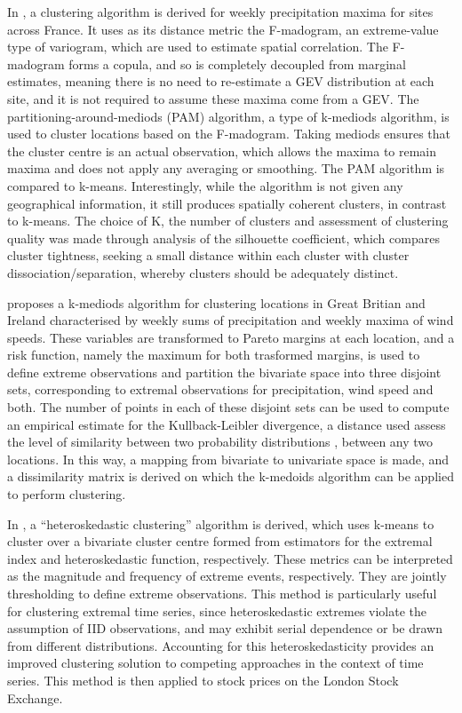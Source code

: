 \documentclass{article}
\numberwithin{equation}{section}
\begin{document}
In \citet{Bernard2013}, a clustering algorithm is derived for weekly precipitation maxima for sites across France.
It uses as its distance metric the F-madogram, an extreme-value type of variogram, which are used to estimate spatial correlation. 
The F-madogram forms a copula, and so is completely decoupled from marginal estimates, meaning there is no need to re-estimate a GEV distribution at each site, and it is not required to assume these maxima come from a GEV.
The partitioning-around-mediods (PAM) algorithm, a type of k-mediods algorithm, is used to cluster locations based on the F-madogram. 
Taking mediods ensures that the cluster centre is an actual observation, which allows the maxima to remain maxima and does not apply any averaging or smoothing. 
The PAM algorithm is compared to k-means.
Interestingly, while the algorithm is not given any geographical information, it still produces spatially coherent clusters, in contrast to k-means.
The choice of K, the number of clusters and assessment of clustering quality was made through analysis of the silhouette coefficient, which compares cluster tightness, seeking a small distance within each cluster with cluster dissociation/separation, whereby clusters should be adequately distinct.

\citet{Vignotto2021} proposes a k-mediods algorithm for clustering locations in Great Britian and Ireland characterised by weekly sums of precipitation and weekly maxima of wind speeds.
These variables are transformed to Pareto margins at each location, and a risk function, namely the maximum for both trasformed margins, is used to define extreme observations and partition the bivariate space into three disjoint sets, corresponding to extremal observations for precipitation, wind speed and both. 
The number of points in each of these disjoint sets can be used to compute an empirical estimate for the Kullback-Leibler divergence, a distance used assess the level of similarity between two probability distributions \cite{Kullback1951}, between any two locations.
In this way, a mapping from bivariate to univariate space is made, and a dissimilarity matrix is derived on which the k-medoids algorithm can be applied to perform clustering. 

In \citet{deCarvalho2023}, a ``heteroskedastic clustering'' algorithm is derived, which uses k-means to cluster over a bivariate cluster centre formed from estimators for the extremal index and heteroskedastic function, respectively. 
These metrics can be interpreted as the magnitude and frequency of extreme events, respectively.
They are jointly thresholding to define extreme observations.
This method is particularly useful for clustering extremal time series, since heteroskedastic extremes violate the assumption of IID observations, and may exhibit serial dependence or be drawn from different distributions. 
Accounting for this heteroskedasticity provides an improved clustering solution to competing approaches in the context of time series. 
This method is then applied to stock prices on the London Stock Exchange. 
\end{document}
